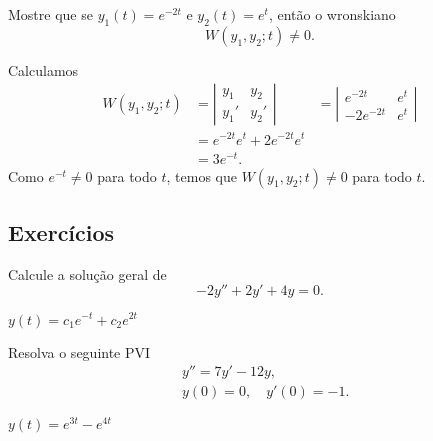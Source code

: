 \begin{exeresol}
  Mostre que se $y_1(t) = e^{-2t}$ e $y_2(t) = e^t$, então o wronskiano
  \begin{equation}
    W(y_1,y_2; t) \neq 0.
  \end{equation}
\end{exeresol}
\begin{resol}
  Calculamos
  \begin{align}
    W(y_1,y_2; t) &= \left|
                    \begin{matrix}
                      y_1 & y_2 \\
                      y_1' & y_2'
                    \end{matrix}
                             \right|
                          &= \left|
                            \begin{matrix}
                              e^{-2t} & e^t \\
                              -2e^{-2t} & e^{t}
                            \end{matrix} \right| \\
                  &= e^{-2t}e^t + 2e^{-2t}e^t \\
                  &= 3e^{-t}.
  \end{align}
  Como $e^{-t} \neq 0$ para todo $t$, temos que $W(y_1,y_2; t)\neq 0$ para todo $t$.
\end{resol}

\subsection*{Exercícios}

\begin{exer}
  Calcule a solução geral de
  \begin{equation}
    -2y'' + 2y' + 4y = 0.
  \end{equation}
\end{exer}
\begin{resp}
  $y(t) = c_1e^{-t} + c_2e^{2t}$
\end{resp}

\begin{exer}
  Resolva o seguinte PVI
  \begin{align}
    &y'' = 7y' - 12y,\\
    &y(0) = 0,\quad y'(0) = -1.
  \end{align}
\end{exer}
\begin{resp}
  $y(t) = e^{3t} - e^{4t}$
\end{resp}

